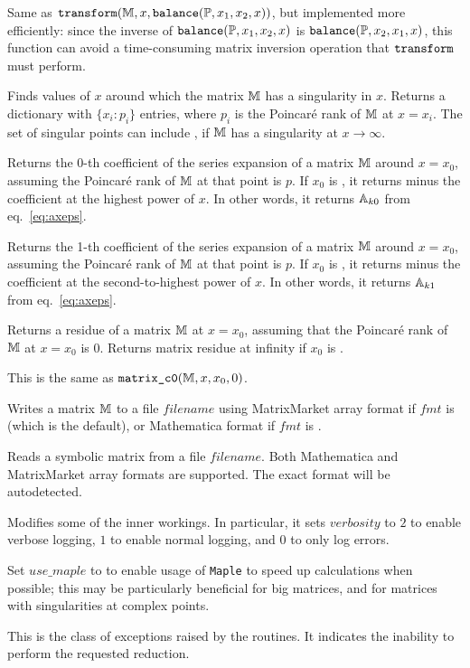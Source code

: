 \documentclass[12pt,a4paper]{article}
\begin{document}
\begin{description}[style=nextline]
Same as $\texttt{transform}(\mathbb{M}, x, \texttt{balance}(\mathbb{P}, x_1, x_2, x))$, but implemented more efficiently: since the inverse of $\texttt{balance}(\mathbb{P}, x_1, x_2, x)$ is $\texttt{balance}(\mathbb{P}, x_2, x_1, x)$, this function can avoid a time-consuming matrix inversion operation that $\texttt{transform}$ must perform.

Finds values of $x$ around which the matrix $\mathbb{M}$ has a singularity in $x$.
Returns a dictionary with $\{x_i: p_i\}$ entries, where $p_i$ is the Poincar\'e rank of $\mathbb{M}$ at $x=x_i$.
The set of singular points can include , if $\mathbb{M}$ has a singularity at $x\to\infty$.

Returns the 0-th coefficient of the series expansion of a matrix $\mathbb{M}$ around $x=x_0$, assuming the Poincar\'e rank of $\mathbb{M}$ at that point is $p$.
If $x_0$ is , it returns minus the coefficient at the highest power of $x$.
In other words, it returns $\mathbb{A}_{k0}$ from eq.~\eqref{eq:axeps}.

Returns the 1-th coefficient of the series expansion of a matrix $\mathbb{M}$ around $x=x_0$, assuming the Poincar\'e rank of $\mathbb{M}$ at that point is $p$.
If $x_0$ is , it returns minus the coefficient at the second-to-highest power of $x$.
In other words, it returns $\mathbb{A}_{k1}$ from eq.~\eqref{eq:axeps}.

Returns a residue of a matrix $\mathbb{M}$ at $x=x_0$, assuming that the Poincar\'e rank of $\mathbb{M}$ at $x=x_0$ is $0$.
Returns matrix residue at infinity if $x_0$ is .

This is the same as $\texttt{matrix\_c0}(\mathbb{M}, x, x_0, 0)$.

Writes a matrix $\mathbb{M}$ to a file $filename$ using MatrixMarket array format if $fmt$ is  (which is the default), or Mathematica format if $fmt$ is .

Reads a symbolic matrix from a file $filename$.
Both Mathematica and MatrixMarket array formats are supported.
The exact format will be autodetected.

Modifies some of the \fuchsia inner workings.
In particular, it sets $verbosity$ to $2$ to enable verbose logging, $1$ to enable normal logging, and $0$ to only log errors.

Set $use\_maple$ to  to enable usage of \texttt{Maple} to speed up calculations when possible; this may be particularly beneficial for big matrices, and for matrices with singularities at complex points.

This is the class of exceptions raised by the \fuchsia routines.
It indicates the inability to perform the requested reduction. 

\end{description}
\end{document}
